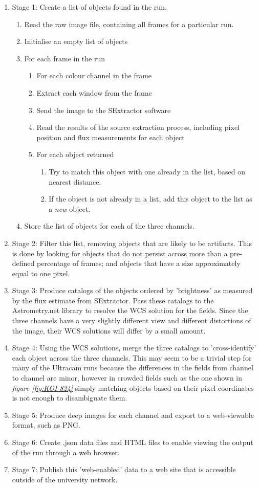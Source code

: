 \documentclass[a4paper,10pt]{article}
\begin{document}
\begin{enumerate}
	\item Stage 1: Create a list of objects found in the run. 
	\begin{enumerate}
		\item Read the raw image file, containing all frames for a particular run.
		\item Initialise an empty list of objects
		\item For each frame in the run
		\begin{enumerate}
			\item For each colour channel in the frame
			\item Extract each window from the frame
			\item Send the image to the SExtractor software
			\item Read the results of the source extraction process, including pixel position and flux measurements for each object
			\item For each object returned
			\begin{enumerate} 
				\item Try to match this object with one already in the list, based on nearest distance.
				\item If the object is not already in a list, add this object to the list as a \emph{new} object.
			\end{enumerate}
		\end{enumerate}
		\item Store the list of objects for each of the three channels.
	\end{enumerate}
	\item Stage 2: Filter this list, removing objects that are likely to be artifacts. This is done by looking for objects that do not persist across more than a pre-defined percentage of frames; and objects that have a size approximately equal to one pixel. 
	\item Stage 3: Produce catalogs of the objects ordered by 'brightness' as measured by the flux estimate from SExtractor. Pass these catalogs to the Astrometry.net library to resolve the WCS solution for the fields. Since the three channels have a very slightly different view and different distortions of the image, their WCS solutions will differ by a small amount.
	\item Stage 4: Using the WCS solutions, merge the three catalogs to 'cross-identify' each object across the three channels. This may seem to be a trivial step for many of the Ultracam runs because the differences in the fields from channel to channel are minor, however in crowded fields such as the one shown in \emph{figure \ref{fig:KOI-824}} simply matching objects based on their pixel coordinates is not enough to disambiguate them.
	\item Stage 5: Produce deep images for each channel and export to a web-viewable format, such as PNG. 
	\item Stage 6: Create .json data files and HTML files to enable viewing the output of the run through a web browser. 
	\item Stage 7: Publish this 'web-enabled' data to a web site that is accessible outside of the university network.  
		

\end{enumerate}
\end{document}
